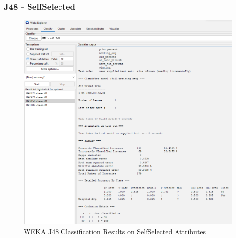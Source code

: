 \documentclass[12pt]{article}
\begin{document}
\subsubsection{J48 - SelfSelected}
\begin{figure}[h!]
    \includegraphics[scale=0.4]{./images/SelfSelected/J48.png}
\centering
    \caption{WEKA J48 Classification Results on SelfSelected Attributes}
    \label{fig:ssj48}
\end{figure}

\newpage 
\end{document}
